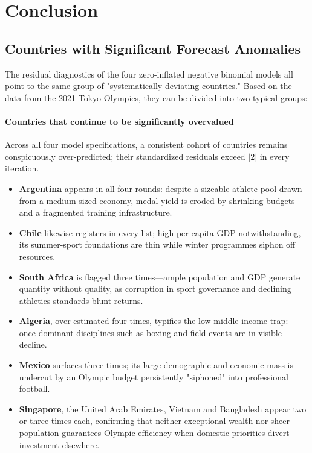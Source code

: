 \documentclass[11pt,twoside]{article}
\numberwithin{Theorem}{section}
\numberwithin{Definition}{section}
\numberwithin{Lemma}{section}
\numberwithin{Algorithm}{section}
\numberwithin{equation}{section}
\begin{document}
\section{Conclusion}
\label{sec:conclusion}

\subsection{Countries with Significant Forecast Anomalies}
\label{subsec:anomalies}

The residual diagnostics of the four zero-inflated negative binomial models all point to the same group of "systematically deviating countries." Based on the data from the 2021 Tokyo Olympics, they can be divided into two typical groups:

\paragraph{Countries that continue to be significantly overvalued}
Across all four model specifications, a consistent cohort of countries remains conspicuously over-predicted; their standardized residuals exceed $|2|$ in every iteration. 

\begin{itemize}
    \item \textbf{Argentina} appears in all four rounds: despite a sizeable athlete pool drawn from a medium-sized economy, medal yield is eroded by shrinking budgets and a fragmented training infrastructure. 
    
    \item \textbf{Chile} likewise registers in every list; high per-capita GDP notwithstanding, its summer-sport foundations are thin while winter programmes siphon off resources. 
    
    \item \textbf{South Africa} is flagged three times---ample population and GDP generate quantity without quality, as corruption in sport governance and declining athletics standards blunt returns. 
    
    \item \textbf{Algeria}, over-estimated four times, typifies the low-middle-income trap: once-dominant disciplines such as boxing and field events are in visible decline. 
    
    \item \textbf{Mexico} surfaces three times; its large demographic and economic mass is undercut by an Olympic budget persistently "siphoned" into professional football. 
    
    \item \textbf{Singapore}, the United Arab Emirates, Vietnam and Bangladesh appear two or three times each, confirming that neither exceptional wealth nor sheer population guarantees Olympic efficiency when domestic priorities divert investment elsewhere.
\end{itemize}
\end{document}
